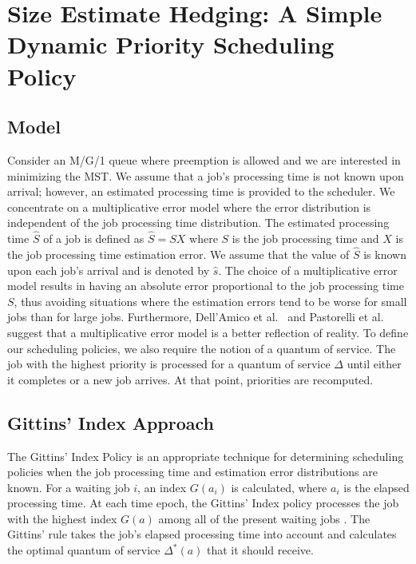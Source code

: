 \section{Size Estimate Hedging: A Simple Dynamic Priority Scheduling Policy} \label{SEH}


\subsection{Model} \label{GeneralModel}
Consider an M/G/1 queue where preemption is allowed and we are interested in minimizing the MST. 
We assume that a job's processing time is not known upon arrival; however, an estimated processing time is provided to the scheduler. We concentrate on a multiplicative error model where the error distribution is independent of the job processing time distribution. The estimated processing time 
$\hat S$ of a job is defined as $\hat S = SX$ where $S$ is the job processing time and $X$ is the job processing time
estimation error. We assume that the value of $\hat S$ is known upon each job's arrival and is denoted by $\hat{s}$. 
The choice of a multiplicative error model results in having an absolute error proportional to the job processing time $S$, thus avoiding situations where the estimation errors tend to be worse for small jobs than for large jobs. Furthermore, Dell'Amico et al.\ \cite{dell2015psbs} and Pastorelli et al.\ \cite{pastorelli2013hfsp} suggest that a multiplicative error model is a better reflection of reality. To define our scheduling policies, we also require the notion of a quantum of service. The job with the highest priority is processed for a quantum of service $\Delta$ until either it completes or a new job arrives. At that point, priorities are recomputed. 



\subsection{Gittins' Index Approach} \label{GittinsIndex}
The Gittins' Index Policy is an appropriate technique for determining scheduling policies when the job processing time and estimation error distributions are known. For a waiting job $i$, an index $G(a_i)$ is calculated, where $a_i$ is the elapsed processing time. At each time epoch, the Gittins' Index policy processes the job with the
highest index $G(a)$ among all of the present waiting jobs \cite{gittins1979bandit}. The Gittins' rule takes the job's elapsed processing time into account and calculates the optimal quantum of service $\Delta ^*(a)$ that it should receive. 



